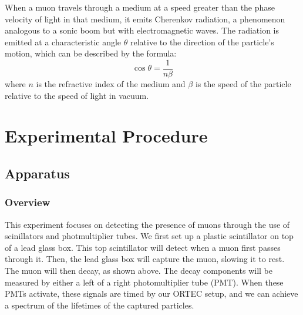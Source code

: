 \documentclass[10pt,letterpaper,onecolumn]{article}
\begin{document}
When a muon travels through a medium at a speed greater than the phase velocity of light in that medium, it emits Cherenkov radiation, a phenomenon analogous to a sonic boom but with electromagnetic waves. The radiation is emitted at a characteristic angle $\theta$ relative to the direction of the particle's motion, which can be described by the formula:
\[
\cos\theta = \frac{1}{n\beta}
\]
where $n$ is the refractive index of the medium and $\beta$ is the speed of the particle relative to the speed of light in vacuum. 
\cite{Jackson1999Electrodynamics}

\section{Experimental Procedure}
\subsection{Apparatus}
\subsubsection{Overview}
This experiment focuses on detecting the presence of muons through the use of scinillators and photmultiplier tubes. We first set up a plastic scintillator on top of a lead glass box. This top scintillator will detect when a muon first passes through it. Then, the lead glass box will capture the muon, slowing it to rest. The muon will then decay, as shown above. The decay components will be measured by either a left of a right photomultiplier tube (PMT). When these PMTs activate, these signals are timed by our ORTEC setup, and we can achieve a spectrum of the lifetimes of the captured particles. 
\end{document}
